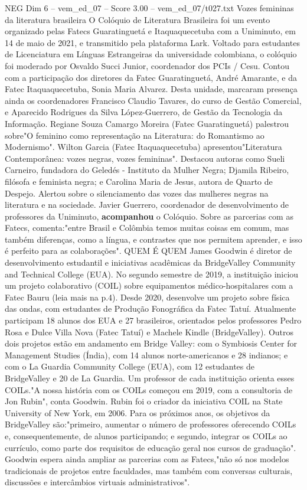 \begin{textsample}{NEG Dim 6 – vem\_ed\_07 – Score 3.00 – vem\_ed\_07/t027.txt}  \label{ex:f6_neg_060}
Vozes femininas da literatura brasileira O Colóquio de Literatura Brasileira foi um evento organizado pelas Fatecs Guaratinguetá e Itaquaquecetuba com a Uniminuto, em 14 de maio de 2021, e transmitido pela plataforma Lark.
Voltado para estudantes de Licenciatura em Línguas Estrangeiras da universidade colombiana, o colóquio foi moderado por Osvaldo Succi Junior, coordenador dos PCIs / Cesu.
Contou com a participação dos diretores da Fatec Guaratinguetá, André Amarante, e da Fatec Itaquaquecetuba, Sonia Maria Alvarez.
Desta unidade, marcaram presença ainda os coordenadores Francisco Claudio Tavares, do curso de Gestão Comercial, e Aparecido Rodrigues da Silva López-Guerrero, de Gestão da Tecnologia da Informação.
Regiane Souza Camargo Moreira (Fatec Guaratinguetá) palestrou sobre"O feminino como representação na Literatura: do Romantismo ao Modernismo".
Wilton Garcia (Fatec Itaquaquecetuba) apresentou"Literatura Contemporânea: vozes negras, vozes femininas".
Destacou autoras como Sueli Carneiro, fundadora do Geledés - Instituto da Mulher Negra; Djamila Ribeiro, filósofa e feminista negra; e Carolina Maria de Jesus, autora de Quarto de Despejo.
Alertou sobre o silenciamento das vozes das mulheres negras na literatura e na sociedade.
Javier Guerrero, coordenador de desenvolvimento de professores da Uniminuto, \textbf{acompanhou} o Colóquio.
Sobre as parcerias com as Fatecs, comenta:"entre Brasil e Colômbia temos muitas coisas em comum, mas também diferenças, como a língua, e contrastes que nos permitem aprender, e isso é perfeito para as colaborações".
QUEM É QUEM James Goodwin é diretor de desenvolvimento estudantil e iniciativas acadêmicas da BridgeValley Community and Technical College (EUA).
No segundo semestre de 2019, a instituição iniciou um projeto colaborativo (COIL) sobre equipamentos médico-hospitalares com a Fatec Bauru (leia mais na p.4).
Desde 2020, desenvolve um projeto sobre física das ondas, com estudantes de Produção Fonográfica da Fatec Tatuí.
Atualmente participam 18 alunos dos EUA e 27 brasileiros, orientados pelos professores Pedro Rosa e Dulce Villa Nova (Fatec Tatuí) e Machele Kindle (BridgeValley).
Outros dois projetos estão em andamento em Bridge Valley: com o Symbiosis Center for Management Studies (Índia), com 14 alunos norte-americanos e 28 indianos; e com o La Guardia Community College (EUA), com 12 estudantes de BridgeValley e 20 de La Guardia.
Um professor de cada instituição orienta esses COILs."A nossa história com os COILs começou em 2019, com a consultoria de Jon Rubin", conta Goodwin.
Rubin foi o criador da iniciativa COIL na State University of New York, em 2006.
Para os próximos anos, os objetivos da BridgeValley são:"primeiro, aumentar o número de professores oferecendo COILs e, consequentemente, de alunos participando; e segundo, integrar os COILs ao currículo, como parte dos requisitos de educação geral nos cursos de graduação".
Goodwin espera ainda ampliar as parcerias com as Fatecs,"não só nos modelos tradicionais de projetos entre faculdades, mas também com conversas culturais, discussões e intercâmbios virtuais administrativos".

\end{textsample}
